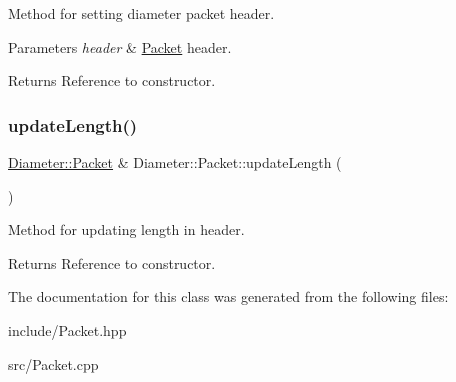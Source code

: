 Method for setting diameter packet header. 


\begin{DoxyParams}{Parameters}
{\em header} & \hyperlink{classDiameter_1_1Packet}{Packet} header. \\
\hline
\end{DoxyParams}
\begin{DoxyReturn}{Returns}
Reference to constructor. 
\end{DoxyReturn}
\mbox{\label{classDiameter_1_1Packet_a822041d59387ef2a8c0f48c2c4bc1054}} 
\subsubsection{\texorpdfstring{update\+Length()}{updateLength()}}
{\footnotesize\ttfamily \hyperlink{classDiameter_1_1Packet}{Diameter\+::\+Packet} \& Diameter\+::\+Packet\+::update\+Length (\begin{DoxyParamCaption}{ }\end{DoxyParamCaption})}



Method for updating length in header. 

\begin{DoxyReturn}{Returns}
Reference to constructor. 
\end{DoxyReturn}


The documentation for this class was generated from the following files\+:\begin{DoxyCompactItemize}
\item 
include/Packet.\+hpp\item 
src/Packet.\+cpp\end{DoxyCompactItemize}

